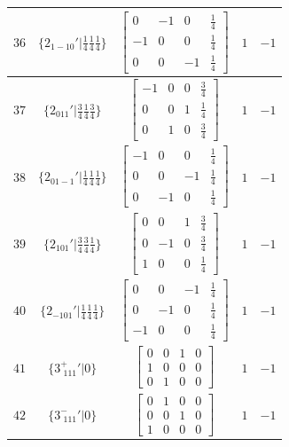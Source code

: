 \documentclass[fleqn,8pt]{jsarticle}
\begin{document}
\begin{longtable}{ccccc}
$ 36 $ & $ \{2{}_{1-10}{}'|\frac{1}{4} \frac{1}{4} \frac{1}{4}\} $ & $ \begin{bmatrix} 0 & -1 & 0 & \frac{1}{4} \\ -1 & 0 & 0 & \frac{1}{4} \\ 0 & 0 & -1 & \frac{1}{4} \end{bmatrix} $ & $ 1 $ & $ -1 $ \\ \hline
$ 37 $ & $ \{2{}_{011}{}'|\frac{3}{4} \frac{1}{4} \frac{3}{4}\} $ & $ \begin{bmatrix} -1 & 0 & 0 & \frac{3}{4} \\ 0 & 0 & 1 & \frac{1}{4} \\ 0 & 1 & 0 & \frac{3}{4} \end{bmatrix} $ & $ 1 $ & $ -1 $ \\ \hline
$ 38 $ & $ \{2{}_{01-1}{}'|\frac{1}{4} \frac{1}{4} \frac{1}{4}\} $ & $ \begin{bmatrix} -1 & 0 & 0 & \frac{1}{4} \\ 0 & 0 & -1 & \frac{1}{4} \\ 0 & -1 & 0 & \frac{1}{4} \end{bmatrix} $ & $ 1 $ & $ -1 $ \\ \hline
$ 39 $ & $ \{2{}_{101}{}'|\frac{3}{4} \frac{3}{4} \frac{1}{4}\} $ & $ \begin{bmatrix} 0 & 0 & 1 & \frac{3}{4} \\ 0 & -1 & 0 & \frac{3}{4} \\ 1 & 0 & 0 & \frac{1}{4} \end{bmatrix} $ & $ 1 $ & $ -1 $ \\ \hline
$ 40 $ & $ \{2{}_{-101}{}'|\frac{1}{4} \frac{1}{4} \frac{1}{4}\} $ & $ \begin{bmatrix} 0 & 0 & -1 & \frac{1}{4} \\ 0 & -1 & 0 & \frac{1}{4} \\ -1 & 0 & 0 & \frac{1}{4} \end{bmatrix} $ & $ 1 $ & $ -1 $ \\ \hline
$ 41 $ & $ \{3^{+}_{\,\,111}{}'|0\} $ & $ \begin{bmatrix} 0 & 0 & 1 & 0 \\ 1 & 0 & 0 & 0 \\ 0 & 1 & 0 & 0 \end{bmatrix} $ & $ 1 $ & $ -1 $ \\ \hline
$ 42 $ & $ \{3^{-}_{\,\,111}{}'|0\} $ & $ \begin{bmatrix} 0 & 1 & 0 & 0 \\ 0 & 0 & 1 & 0 \\ 1 & 0 & 0 & 0 \end{bmatrix} $ & $ 1 $ & $ -1 $ \\ \hline

\end{longtable}
\end{document}
